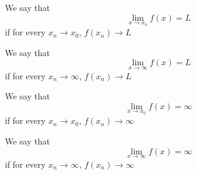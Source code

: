 \begin{SNP}{\dfn}{We say that $$\lim_{x\rightarrow x_0}f(x) = L$$ if for every $x_n \rightarrow x_0$, $f(x_n) \rightarrow L$}
\end{SNP}
\begin{SNP}{\dfn}{We say that $$\lim_{x\rightarrow \infty}f(x) = L$$ if for every $x_n \rightarrow \infty$, $f(x_n) \rightarrow L$}
\end{SNP}
\begin{SNP}{\dfn}{We say that $$\lim_{x\rightarrow x_0}f(x) = \infty$$ if for every $x_n \rightarrow x_0$, $f(x_n) \rightarrow \infty$}
\end{SNP}
\begin{SNP}{\dfn}{We say that $$\lim_{x\rightarrow \infty}f(x) = \infty$$ if for every $x_n \rightarrow \infty$, $f(x_n) \rightarrow \infty$}
\end{SNP}

